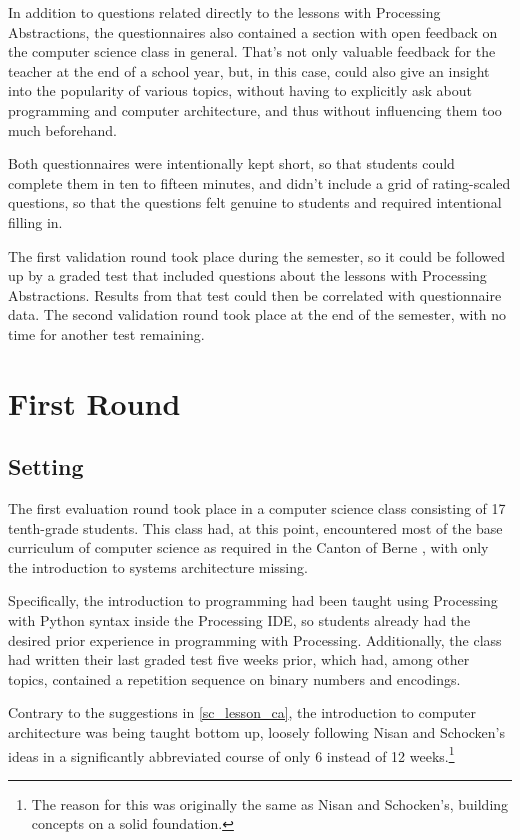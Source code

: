 In addition to questions related directly to the lessons with Processing Abstractions, the questionnaires also contained a section with open feedback on the computer science class in general. That's not only valuable feedback for the teacher at the end of a school year, but, in this case, could also give an insight into the popularity of various topics, without having to explicitly ask about programming and computer architecture, and thus without influencing them too much beforehand.

Both questionnaires were intentionally kept short, so that students could complete them in ten to fifteen minutes, and didn't include a grid of rating-scaled questions, so that the questions felt genuine to students and required intentional filling in.

The first validation round took place during the semester, so it could be followed up by a graded test that included questions about the lessons with Processing Abstractions. Results from that test could then be correlated with questionnaire data. The second validation round took place at the end of the semester, with no time for another test remaining.



\section{First Round} \label{sc_validation_ca} %


\subsection{Setting}

The first evaluation round took place in a computer science class consisting of 17 tenth-grade students. This class had, at this point, encountered most of the base curriculum of computer science as required in the Canton of Berne \cite[p.\,145--146]{Erz16}, with only the introduction to systems architecture missing.

Specifically, the introduction to programming had been taught using Processing with Python syntax inside the Processing \ac{IDE}, so students already had the desired prior experience in programming with Processing. Additionally, the class had written their last graded test five weeks prior, which had, among other topics, contained a repetition sequence on binary numbers and encodings.

Contrary to the suggestions in \ref{sc_lesson_ca}, the introduction to computer architecture was being taught bottom up, loosely following Nisan and Schocken's ideas \cite{Nis21} in a significantly abbreviated course of only 6 instead of 12 weeks.\footnote{The reason for this was originally the same as Nisan and Schocken's, \ie building concepts on a solid foundation.}

